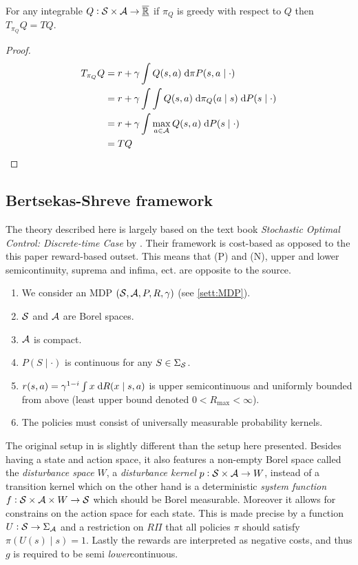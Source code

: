 \begin{prop}
  For any integrable $Q : \mathcal{S} \times \mathcal{A} \to \overline{\underline{\mathbb{R}}}$
  if $\pi_Q$ is greedy with respect to $Q$ then $T_{\pi_Q} Q = TQ$.
\end{prop}
\begin{proof}
  \begin{align*}
    T_{\pi_Q} Q &= r + \gamma \int Q(s, a) \; \mathrm{d} \pi P(s, a \mid \cdot)
    \\ &= r + \gamma \int \int Q(s, a)
    \; \mathrm{d} \pi_Q(a \mid s) \; \mathrm{d} P(s \mid \cdot)
    \\ &= r + \gamma \int \max_{a \in \mathcal{A}} Q(s, a)
    \; \mathrm{d} P(s \mid \cdot)
    \\ &= T Q
  \end{align*}
\end{proof}


\subsection{Bertsekas-Shreve framework}
The theory described here is largely based on the text book
\emph{Stochastic Optimal Control: Discrete-time Case} by
.
Their framework is cost-based as opposed to the this paper reward-based outset.
This means that (P) and (N), upper and lower semicontinuity,
suprema and infima, ect. are opposite to the source.
\begin{sett}[BS]
  \leavevmode
  \begin{enumerate}
    \item We consider an MDP $(\mathcal{S}, \mathcal{A}, P, R, \gamma)$
      (see \cref{sett:MDP}).
    \item $\mathcal{S}$ and $\mathcal{A}$ are Borel spaces.
    \item $\mathcal{A}$ is compact.
    \item $P(S \mid \cdot)$ is continuous for any $S \in \Sigma_{\mathcal{S}}$.
    \item $r(s,a) = \gamma^{1-i} \int x \; \mathrm{d} R(x \mid s, a)$ 
      is upper semicontinuous and uniformly bounded from above
      (least upper bound denoted $0 < R_{\max} < \infty$).
    \item The policies must consist of
      universally measurable probability kernels.
  \end{enumerate}
  \label{sett:BS}
\end{sett}
The original setup in 
is slightly different than the setup here presented.
Besides having a state and action space, it also features a 
non-empty Borel space called the
\emph{disturbance space} $W$, a \emph{disturbance kernel}
$p: \mathcal{S} \times \mathcal{A} \to W$,
instead of a transition kernel which on the other hand is a deterministic
\emph{system function} $f : \mathcal{S} \times \mathcal{A} \times W \to \mathcal{S}$
which should be Borel measurable.
Moreover it allows for constrains on the action space for each state.
This is made precise by a function $U:\mathcal{S} \to \Sigma_{\mathcal{A}}$
and a restriction on $R\Pi$ that all policies $\pi$ should satisfy
$\pi(U(s) \mid s) = 1$.
Lastly the rewards are interpreted as negative costs, and thus
$g$ is required to be semi \emph{lower}continuous.

